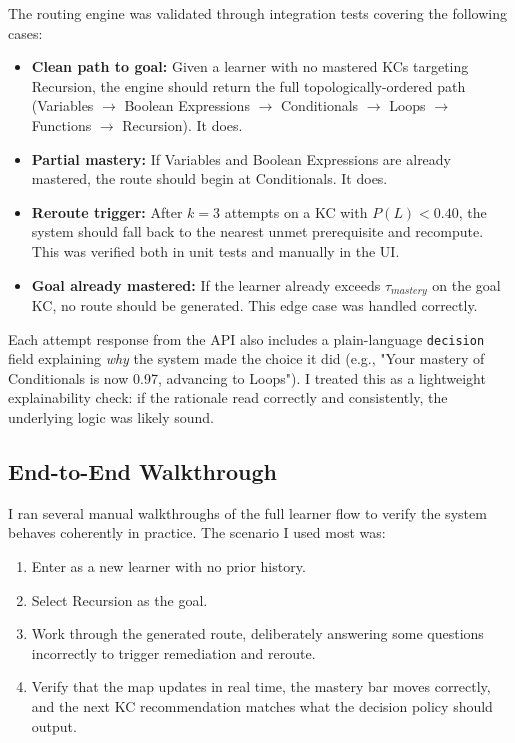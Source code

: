 \documentclass{article}
\begin{document}
The routing engine was validated through integration tests covering the following cases:

\begin{itemize}
    \item \textbf{Clean path to goal:} Given a learner with no mastered KCs targeting Recursion, the engine should return the full topologically-ordered path (Variables $\to$ Boolean Expressions $\to$ Conditionals $\to$ Loops $\to$ Functions $\to$ Recursion). It does.
    \item \textbf{Partial mastery:} If Variables and Boolean Expressions are already mastered, the route should begin at Conditionals. It does.
    \item \textbf{Reroute trigger:} After $k = 3$ attempts on a KC with $P(L) < 0.40$, the system should fall back to the nearest unmet prerequisite and recompute. This was verified both in unit tests and manually in the UI.
    \item \textbf{Goal already mastered:} If the learner already exceeds $\tau_{mastery}$ on the goal KC, no route should be generated. This edge case was handled correctly.
\end{itemize}

Each attempt response from the API also includes a plain-language \texttt{decision} field explaining \textit{why} the system made the choice it did (e.g., "Your mastery of Conditionals is now 0.97, advancing to Loops"). I treated this as a lightweight explainability check: if the rationale read correctly and consistently, the underlying logic was likely sound.

\subsection{End-to-End Walkthrough}

I ran several manual walkthroughs of the full learner flow to verify the system behaves coherently in practice. The scenario I used most was:

\begin{enumerate}
    \item Enter as a new learner with no prior history.
    \item Select Recursion as the goal.
    \item Work through the generated route, deliberately answering some questions incorrectly to trigger remediation and reroute.
    \item Verify that the map updates in real time, the mastery bar moves correctly, and the next KC recommendation matches what the decision policy should output.
\end{enumerate}
\end{document}
